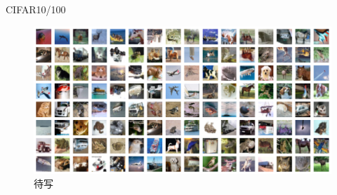 CIFAR10/100\cite{cifar}

\begin{figure}
\centering
\includegraphics[width=\textwidth]{figures/cifar10_random_grid_view.pdf}
\caption{待写}
\label{fig:cifar10_random_grid_view}
\end{figure}


